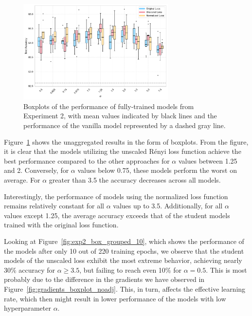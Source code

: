 \begin{figure}[h!]
	\centering
	\includegraphics[width=0.7\textwidth]{../img/exp2_box_grouped_220.pdf}
	\caption{Boxplots of the performance of fully-trained models from Experiment 2, with mean values indicated by black lines and the performance of the vanilla model represented by a dashed gray line.}
	\label{fig:exp2_box_grouped_220}
\end{figure}

Figure~\ref{fig:exp2_box_grouped_220} shows the unaggregated results in the form of boxplots. From the figure, it is clear that the models utilizing the unscaled Rényi loss function achieve the best performance compared to the other approaches for $\alpha$ values between 1.25 and 2. Conversely, for $\alpha$ values below 0.75, these models perform the worst on average. For $\alpha$ greater than 3.5 the accuracy decreases across all models.

Interestingly, the performance of models using the normalized loss function remains relatively constant for all $\alpha$ values up to 3.5. Additionally, for all $\alpha$ values except 1.25, the average accuracy exceeds that of the student models trained with the original loss function.

Looking at Figure~\ref{fig:exp2_box_grouped_10}, which shows the performance of the models after only 10 out of 220 training epochs, we observe that the student models of the unscaled loss exhibit the most extreme behavior, achieving nearly 30\% accuracy for $\alpha \geq 3.5$, but failing to reach even 10\% for $\alpha=0.5$. This is most probably due to the difference in the gradients we have observed in Figure~\ref{fig:gradients_boxplot_noadj}. This, in turn, affects the effective learning rate, which then might result in lower performance of the models with low hyperparameter $\alpha$.

